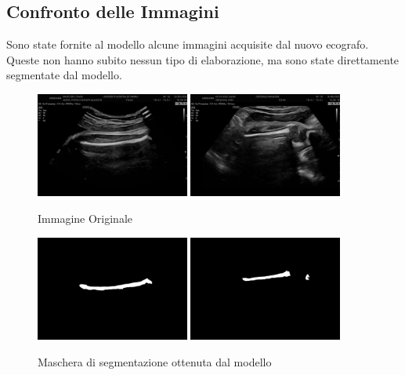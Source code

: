 \subsection{Confronto delle Immagini}
\label{subsec:confronto_immagini}

Sono state fornite al modello alcune immagini acquisite dal nuovo ecografo. Queste non hanno subito
nessun tipo di elaborazione, ma sono state direttamente segmentate dal modello.


\begin{figure}[!ht]
    \centering
    \includegraphics[width=0.45\textwidth]{./Immagini/nuovo_ecografo_results/0_image.png}
    \includegraphics[width=0.45\textwidth]{./Immagini/nuovo_ecografo_results/3_image.png}
    \caption{Immagine Originale}
    \label{fig:immagine_originale}
\end{figure}

\begin{figure}[!ht]
    \centering
    \includegraphics[width=0.45\textwidth]{./Immagini/nuovo_ecografo_results/0_mask.png}
    \includegraphics[width=0.45\textwidth]{./Immagini/nuovo_ecografo_results/3_mask.png}
    \caption{Maschera di segmentazione ottenuta dal modello}
    \label{fig:maschera}
\end{figure}

